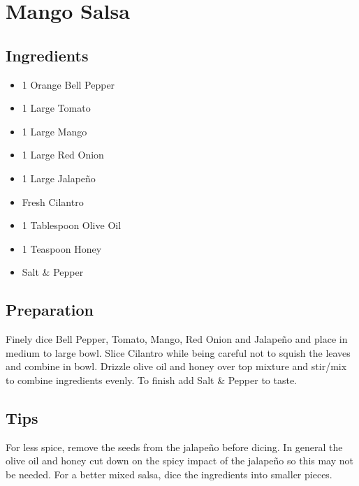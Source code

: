 \thispagestyle{fancy}
\section{Mango Salsa}
\AddToShipoutPicture*{\MangoSalsa}

\subsection*{Ingredients}
\begin{multicols}{3}
	\begin{itemize}
		\item 1 Orange Bell Pepper
		\item 1 Large Tomato
		\item 1 Large Mango
		\item 1 Large Red Onion
		\item 1 Large Jalape\~{n}o
		\item Fresh Cilantro
		\item 1 Tablespoon Olive Oil
		\item 1 Teaspoon Honey
		\item Salt \& Pepper  
	\end{itemize}
\end{multicols}

\subsection*{Preparation}
Finely dice Bell Pepper, Tomato, Mango, Red Onion and Jalape\~{n}o and place in medium to large bowl. Slice Cilantro while being careful not to squish the leaves and combine in bowl. Drizzle olive oil and honey over top mixture and stir/mix to combine ingredients evenly. To finish add Salt \& Pepper to taste.

\subsection*{Tips}

For less spice, remove the seeds from the jalape\~{n}o before dicing. In general the olive oil and honey cut down on the spicy impact of the jalape\~{n}o so this may not be needed. For a better mixed salsa, dice the ingredients into smaller pieces. 